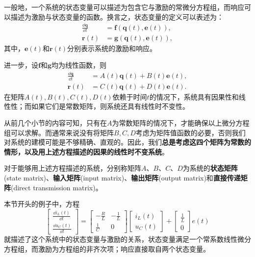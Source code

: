 一般地，一个系统的状态变量可以描述为包含它与激励的常微分方程组，而响应可以描述为激励与状态变量的函数。换言之，状态变量的定义可以表述为：
\begin{align}
    \frac{\dd\mathbf{q}}{\dd t}&=\mathbf{f}(\mathbf{q}(t),\mathbf{e}(t)),\\
    \mathbf{r}(t)&=\mathbf{g}(\mathbf{q}(t),\mathbf{e}(t)),
\end{align}
其中，$\mathbf{e}(t)$和$\mathbf{r}(t)$分别表示系统的激励和响应。

进一步，设$\mathbf{f}$和$\mathbf{g}$均为线性函数，则
\begin{align}
    \frac{\dd\mathbf{q}}{\dd t}&=A(t)\mathbf{q}(t)+B(t)\mathbf{e}(t),\\
    \mathbf{r}(t)&=C(t)\mathbf{q}(t)+D(t)\mathbf{e}(t).
\end{align}
在矩阵$A(t),B(t),C(t),D(t)$依赖于时间$t$的情况下，系统具有因果性和线性性；而如果它们是常数矩阵，则系统还具有线性时不变性。

从前几个小节的内容可知，只有在$A$为常数矩阵的情况下，才能确保以上微分方程组可以求解。而通常来说没有将矩阵$B,C,D$考虑为矩阵值函数的必要，否则我们对系统的建模可能是不够精确、直观的。因此，我们\textbf{总是考虑这四个矩阵为常数的情形，以及用上述方程描述的因果的线性时不变系统}。

\begin{definition}
    对于能够用上述方程描述的系统，分别称矩阵$A$、$B$、$C$、$D$为系统的\textbf{状态矩阵}(state matrix)、\textbf{输入矩阵}(input matrix)、\textbf{输出矩阵}(output matrix)和\textbf{直接传递矩阵}(direct transmission matrix)。
\end{definition}

\begin{example}
    本节开头的例子中，方程
    \begin{equation}
        \begin{bmatrix}
            \frac{\dd i_L(t)}{\dd t}\\
            \frac{\dd u_C(t)}{\dd t}
        \end{bmatrix}=
        \begin{bmatrix}
            -\frac{R}{L} & -\frac{1}{L}\\
            \frac{1}{C} & 0
        \end{bmatrix}
        \begin{bmatrix}
            i_L(t)\\
            u_C(t)
        \end{bmatrix}+
        \begin{bmatrix}
            \frac{1}{L}\\
            0
        \end{bmatrix}e(t)
    \end{equation}
    就描述了这个系统中的状态变量与激励的关系，状态变量满足一个常系数线性微分方程组，而激励为方程组的非齐次项；响应直接取自两个状态变量。
\end{example}

